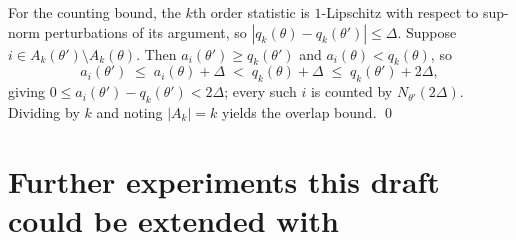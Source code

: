 \documentclass{article}
\begin{document}
For the counting bound, the $k$th order statistic is $1$-Lipschitz with respect to sup-norm
perturbations of its argument, so $|q_k(\theta)-q_k(\theta')|\le\Delta$. Suppose
$i\in A_k(\theta')\setminus A_k(\theta)$. Then $a_i(\theta')\ge q_k(\theta')$ and
$a_i(\theta)<q_k(\theta)$, so
\[
a_i(\theta')\;\le\;a_i(\theta)+\Delta\;<\;q_k(\theta)+\Delta\;\le\;q_k(\theta')+2\Delta ,
\]
giving $0\le a_i(\theta')-q_k(\theta')<2\Delta$; every such $i$ is counted by
$N_{\theta'}(2\Delta)$. Dividing by $k$ and noting $|A_k|=k$ yields the overlap bound.
\qed

\section{Further experiments this draft could be extended with}
\label{app:pending}
\end{document}
